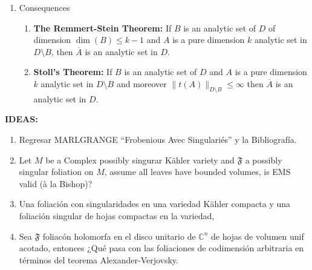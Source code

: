 \documentclass[12pt,twoside,a4paper]{report}
\newcommand{\co}{\ensuremath{\mathbb C }}
\begin{document}
\begin{enumerate}
\item Consequences
\label{sec:org6dba31e}
\begin{enumerate}
\item \textbf{The Remmert-Stein Theorem:} If $B$ is an analytic set of $D$ of dimension $\dim(B)\leq k-1$ and $A$ is a pure dimension $k$ analytic set in $D\setminus B$, then $\overline{A}$ is an analytic set in $D$.
\item \textbf{Stoll's Theorem:} If $B$ is an analytic set of $D$ and $A$ is a pure dimension $k$ analytic set in $D\setminus B$ and moreover $\|t(A)\|_{D\setminus B}\leq\infty$ then $\overline{A}$ is an analytic set in $D$.
\end{enumerate}
\end{enumerate}
\HUGE\textbf{IDEAS:}
\begin{enumerate}
  \item Regresar MARLGRANGE ``Frobenious Avec Singulariés'' y la Bibliografía.
  \item Let $M$ be a Complex possibly singurar Kähler variety and \(\mathfrak{F}\) a possibly singular foliation on $M$, assume all leaves have bounded volumes, is EMS valid (à la Bishop)?
  \item Una foliación con singularidades en una variedad Kähler compacta y una foliación singular de hojas compactas en la variedad,
  \item Sea \(\mathfrak{F}\) foliacón holomorfa en el disco unitario de \(\co^n\) de hojas de volumen unif acotado, entonces ¿Qué pasa con las foliaciones de codimensión arbitraria en términos del teorema Alexander-Verjovsky.
\end{enumerate}
\end{document}
